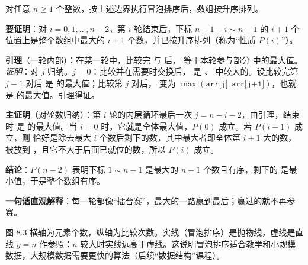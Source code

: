 \begin{theorembox}[冒泡排序的正确性]
对任意 $n\ge1$ 个整数，按上述边界执行冒泡排序后，数组按升序排列。
\end{theorembox}
\begin{proofbox}
\textbf{要证明}：对 $i=0,1,\dots,n-2$，第 $i$ 轮结束后，下标 $n-1-i\sim n-1$ 的 $i+1$ 个位置上是整个数组中最大的 $i+1$ 个数，并已按升序排列（称为“性质 $P(i)$”）。

\textbf{引理}（一轮内部）：在某一轮中，比较完  与  后， 等于本轮参与部分  中的最大值。\\
\emph{证明}：对 $j$ 归纳。$j=0$：比较并在需要时交换后， 是 、 中较大的。设比较完第 $j-1$ 对后  是  的最大值；比较第 $j$ 对后， 变为 $\max(\texttt{arr[j]},\texttt{arr[j+1]})$，也就是  的最大值。引理得证。

\textbf{主证明}（对轮数归纳）：第 $i$ 轮的内层循环最后一次 $j=n-i-2$，由引理，结束时  是  的最大值。当 $i=0$ 时，它就是全体最大值，$P(0)$ 成立。若 $P(i-1)$ 成立，则  恰好是除去最大 $i$ 个数后剩下的数，其中最大者即全体第 $i+1$ 大的数，被放到 ，且它不大于后面已就位的数，所以 $P(i)$ 成立。

\textbf{结论}：$P(n-2)$ 表明下标 $1\sim n-1$ 是最大的 $n-1$ 个数且有序，剩下的  是最小值，于是整个数组有序。

\textbf{一句话直观解释}：每一轮都像“擂台赛”，最大的一路赢到最后；赢过的就不再参赛。
\end{proofbox}

\begin{center}
\end{center}
图 8.3 横轴为元素个数，纵轴为比较次数。实线（冒泡排序）是抛物线，虚线是直线 $y=n$ 作参照：$n$ 较大时实线远高于虚线。这说明冒泡排序适合教学和小规模数据，大规模数据需要更快的算法（后续“数据结构”课程）。

